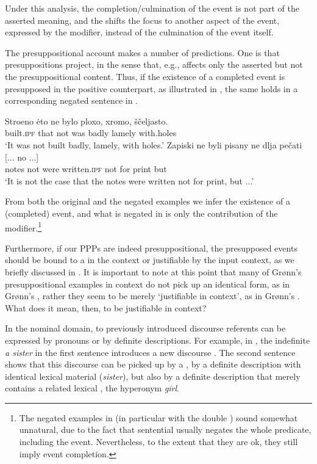 \documentclass[output=paper,modfonts,newtxmath,hidelinks
\ChapterDOI{10.5281/zenodo.2545513}
]{langscibook}
\begin{document}
\noindent Under this analysis, the completion/culmination of the event is not part of the asserted meaning, and the  shifts the focus to another aspect of the event, expressed by the  modifier, instead of the culmination of the event itself. 

The presuppositional account makes a number of predictions. One is that presuppositions project, in the sense that, e.g.,  affects only the asserted but not the presuppositional content. Thus, if the existence of a completed event is presupposed in the positive counterpart, as illustrated in , the same holds in a corresponding negated sentence in .

\ea\label{stroenoneg}
\ea\gll 	Stroeno \.{e}to ne bylo ploxo, xromo, ščeljasto. \\
	built.\textsc{ipf} that not was badly lamely with.holes\\
 \glt   `It was not built badly, lamely, with holes.'
\ex\gll 	Zapiski ne byli pisany ne dlja pečati [... no ...]	\\
	notes not were written.\textsc{ipf} not for print          {}       but {}\\
\glt    `It is not the case that the notes were written not for print, but ...'\label{stroenonegb}
\z\z

\noindent From both the original and the negated examples we infer the existence of a (completed) event, and what is negated in  is only the contribution of the modifier.\footnote{The negated examples in  (in particular  with the double ) sound somewhat unnatural, due to the fact that sentential  usually negates the whole predicate, including the event. Nevertheless, to the extent that they are ok, they still imply event completion.}

Furthermore, if our  PPPs are indeed presuppositional, the presupposed events should be bound to a  in the context or justifiable by the input context, as we briefly discussed in . It is important to note at this point that many of Grønn's presuppositional  examples in context do not pick up an identical  form, as in Grønn's , rather they seem to be merely `justifiable in context', as in Grønn's .  What does it mean, then, to be justifiable in context? 

In the nominal domain,  to previously introduced discourse referents can be expressed by pronouns or by definite descriptions. For example, in , the indefinite \textit{a sister} in the first sentence introduces a new discourse . The second sentence shows that this discourse  can be picked up by a , by a definite description with identical lexical material (\textit{sister}), but also by a definite description that merely contains a related lexical , the hyperonym \textit{girl}. 
\end{document}
